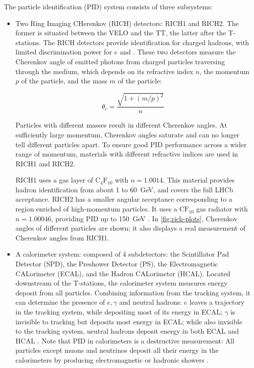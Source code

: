 The particle identification (PID) system consists of three subsystems:

\begin{itemize}
    \item Two Ring Imaging CHerenkov (RICH) detectors:
        RICH1 and RICH2.
        The former is situated between the VELO and the TT,
        the latter after the T-stations.
        The RICH detectors provide identification for charged hadrons,
        with limited discrimination power for $e$ and \muon.
        These two detectors measure the Cherenkov angle of emitted photons from
        charged particles traversing through the medium,
        which depends on its refractive index $n$,
        the momentum $p$ of the particle, and the mass $m$ of the particle:

        \begin{equation}
            \theta_c = \frac{\sqrt{1 + (m/p)^2}}{n}
        \end{equation}

        Particles with different masses result in different Cherenkov angles.
        At sufficiently large momentum,
        Cherenkov angles saturate and can no longer tell different particles
        apart.
        To ensure good PID performance across a wider range of momentum,
        materials with different refractive indices are used in RICH1 and RICH2.

        RICH1 uses a gas layer of $\text{C}_4 \text{F}_{10}$ with $n = 1.0014$.
        This material provides hadron identification from about 1 to 60~GeV,
        and covers the full LHCb acceptance.
        RICH2 has a smaller angular acceptance corresponding to a region enriched
        of high-momentum particles.
        It uses a $\text{C}\text{F}_{10}$ gas radiator with $n = 1.00046$,
        providing PID up to 150~GeV
        \cite{Belyaev_2021}.
        In \cref{fig:rich-plots}, Cherenkov angles of different particles are
        shown; it also displays a real measurement of Cherenkov angles from
        RICH1.

    \item A calorimeter system:
        composed of 4 subdetectors:
        the Scintillator Pad Detector (SPD), the Preshower Detector (PS),
        the Electromagnetic CALorimeter (ECAL),
        and the Hadron CALorimeter (HCAL).
        Located downstream of the T-stations, the calorimeter system measures
        energy deposit from all particles.
        Combining information from the tracking system,
        it can determine the presence of $e, \gamma$ and neutral
        hadrons:
        $e$ leaves a trajectory in the tracking system, while depositing most
        of its energy in ECAL;
        $\gamma$ is invisible to tracking but deposits most energy in ECAL;
        while also invisible to the tracking system,
        neutral hadrons deposit energy in both ECAL and HCAL
        \cite{Belyaev_2021}.
        Note that PID in calorimeters is a destructive measurement:
        All particles except muons and neutrinos deposit all their energy
        in the calorimeters by producing electromagnetic or hadronic showers
        \cite{Lippmann_2012}.


\end{itemize}

